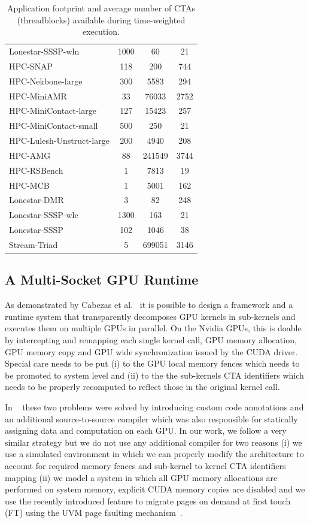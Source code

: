 \begin{table}[t]
\begin{small}
\begin{tabular}{lccc}
Lonestar-SSSP-wln & 1000 & 60 & 21 \\
HPC-SNAP & 118 & 200 & 744 \\
HPC-Nekbone-large & 300 & 5583 & 294 \\
HPC-MiniAMR & 33 & 76033 & 2752 \\
HPC-MiniContact-large & 127 & 15423 & 257 \\
HPC-MiniContact-small & 500 & 250 & 21 \\
HPC-Lulesh-Unstruct-large & 200 & 4940 & 208 \\
HPC-AMG & 88 & 241549 & 3744 \\
HPC-RSBench & 1 & 7813 & 19 \\
HPC-MCB & 1 & 5001 & 162 \\
Lonestar-DMR & 3 & 82 & 248 \\
Lonestar-SSSP-wlc & 1300 & 163 & 21 \\
Lonestar-SSSP & 102 & 1046 & 38 \\
Stream-Triad & 5 & 699051 & 3146 \\
\toprule
\end{tabular}
\caption{Application footprint and average number of CTAs (threadblocks) available during time-weighted execution.}
\label{tab:numctas}
\end{small}
\end{table}

\subsection{A Multi-Socket GPU Runtime}

As demonstrated by Cabezas et al.~\cite{Cabezas2015} it is possible to design 
a framework and a runtime system that transparently decomposes GPU kernels in 
sub-kernels and executes them on multiple GPUs in parallel. On the Nvidia 
GPUs, this is doable by intercepting and remapping each single kernel call, 
GPU memory allocation, GPU memory copy and GPU wide synchronization issued by 
the CUDA driver. Special care needs to be put (i) to the GPU local memory 
fences which needs to be promoted to system level and (ii) to the the 
sub-kernels CTA identifiers which needs to be properly recomputed to 
reflect those in the original kernel call. 
 
In ~\cite{Cabezas2015} these two problems were solved by introducing custom 
code annotations and an additional source-to-source compiler which was also 
responsible for statically assigning data and computation on each GPU. In our 
work, we follow a very similar strategy but we do not use any additional 
compiler for two reasons (i) we use a simulated environment in which 
we can properly modify the architecture to account for required memory fences 
and sub-kernel to kernel CTA identifiers mapping (ii) we model a system in 
which all GPU memory allocations are performed on system memory, explicit 
CUDA memory copies are disabled and we use the recently introduced feature to 
migrate pages on demand at first touch (FT) using the UVM page faulting 
mechanism~\cite{P100}. 

